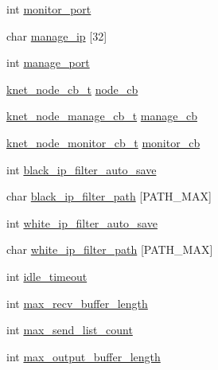 \begin{DoxyCompactItemize}
\item 
int \hyperlink{a00034_acbc571ffdf820ad41472cd6f6ffbd0a0_acbc571ffdf820ad41472cd6f6ffbd0a0}{monitor\+\_\+port}
\item 
char \hyperlink{a00034_aa0c6d27155f0bb9b1e26824c8f5173a6_aa0c6d27155f0bb9b1e26824c8f5173a6}{manage\+\_\+ip} \mbox{[}32\mbox{]}
\item 
int \hyperlink{a00034_afbd6795a1ddffb7be98d8b43fa586680_afbd6795a1ddffb7be98d8b43fa586680}{manage\+\_\+port}
\item 
\hyperlink{a00066_a09c2d1f8eef7dc82226691ce39b7c4d8_a09c2d1f8eef7dc82226691ce39b7c4d8}{knet\+\_\+node\+\_\+cb\+\_\+t} \hyperlink{a00034_aa29b41a7596888d1836d83e5c6f316b0_aa29b41a7596888d1836d83e5c6f316b0}{node\+\_\+cb}
\item 
\hyperlink{a00066_acd4bad75f444cb56dffa5f9413bbe456_acd4bad75f444cb56dffa5f9413bbe456}{knet\+\_\+node\+\_\+manage\+\_\+cb\+\_\+t} \hyperlink{a00034_a91a255d7d9da88978d9e45d83c90bba0_a91a255d7d9da88978d9e45d83c90bba0}{manage\+\_\+cb}
\item 
\hyperlink{a00066_aabd13837697aceb20b2a2cb8908e79cd_aabd13837697aceb20b2a2cb8908e79cd}{knet\+\_\+node\+\_\+monitor\+\_\+cb\+\_\+t} \hyperlink{a00034_afbf5fdd4e5b6a26f6b3ebe3930abf59f_afbf5fdd4e5b6a26f6b3ebe3930abf59f}{monitor\+\_\+cb}
\item 
int \hyperlink{a00034_a6a0ac103d85cdfe46fe7cdfaca1e75f8_a6a0ac103d85cdfe46fe7cdfaca1e75f8}{black\+\_\+ip\+\_\+filter\+\_\+auto\+\_\+save}
\item 
char \hyperlink{a00034_ac7f8511fcc53cf30f9bc3e3f0e79606c_ac7f8511fcc53cf30f9bc3e3f0e79606c}{black\+\_\+ip\+\_\+filter\+\_\+path} \mbox{[}P\+A\+T\+H\+\_\+\+M\+A\+X\mbox{]}
\item 
int \hyperlink{a00034_abf5a8f141bd35ed595ae82b5160552fd_abf5a8f141bd35ed595ae82b5160552fd}{white\+\_\+ip\+\_\+filter\+\_\+auto\+\_\+save}
\item 
char \hyperlink{a00034_ae7ab0d26ddcc9598349e71eb2414ce2d_ae7ab0d26ddcc9598349e71eb2414ce2d}{white\+\_\+ip\+\_\+filter\+\_\+path} \mbox{[}P\+A\+T\+H\+\_\+\+M\+A\+X\mbox{]}
\item 
int \hyperlink{a00034_a9d009e801fe1380b3c9cd427b4f9d596_a9d009e801fe1380b3c9cd427b4f9d596}{idle\+\_\+timeout}
\item 
int \hyperlink{a00034_ab9706c0983707e893855e4c448de397f_ab9706c0983707e893855e4c448de397f}{max\+\_\+recv\+\_\+buffer\+\_\+length}
\item 
int \hyperlink{a00034_a7592a8e9222b092f853b3c302cfbc88b_a7592a8e9222b092f853b3c302cfbc88b}{max\+\_\+send\+\_\+list\+\_\+count}
\item 
int \hyperlink{a00034_af56628274c658a5921967f7d0d66db64_af56628274c658a5921967f7d0d66db64}{max\+\_\+output\+\_\+buffer\+\_\+length}
\end{DoxyCompactItemize}



